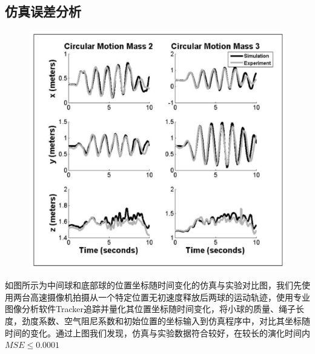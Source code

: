 \documentclass[12pt,a4paper]{ctexart}
\begin{document}
	\subsection{仿真误差分析}
		\begin{figure}[h] %
	\centering %
	\includegraphics[height=16\baselineskip]{T098.jpg} %
\end{figure}%
	如图所示为中间球和底部球的位置坐标随时间变化的仿真与实验对比图，我们先使用两台高速摄像机拍摄从一个特定位置无初速度释放后两球的运动轨迹，使用专业图像分析软件Tracker追踪并量化其位置坐标随时间变化，将小球的质量、绳子长度，劲度系数、空气阻尼系数和初始位置的坐标输入到仿真程序中，对比其坐标随时间的变化。通过上图我们发现，仿真与实验数据符合较好，在较长的演化时间内$MSE \leqslant 0.0001$
	
	
\end{document}
